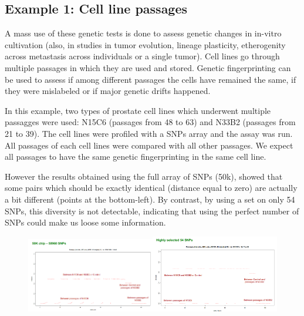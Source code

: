 \subsection*{Example 1: Cell line passages}

A mass use of these genetic tests is done to assess genetic changes in in-vitro cultivation (also, in studies in tumor evolution, lineage plasticity, etherogenity across metastasis across individuals or a single tumor).
Cell lines go through multiple passages in which they are used and stored. Genetic fingerprinting can be used to assess if among different passages the cells have remained the same, if they were mislabeled or if major genetic drifts happened.

In this example, two types of prostate cell lines which underwent multiple passagges were used: N15C6 (passages from 48 to 63) and N33B2 (passages from 21 to 39).
The cell lines were profiled with a SNPs array and the assay was run.
All passages of each cell lines were compared with all other passages. We expect all passages to have the same genetic fingerprinting in the same cell line.  

However the results obtained using the full array of SNPs (50k), showed that some pairs which should be exactly identical (distance equal to zero) are actually a bit different (points at the bottom-left).
By contrast, by using a set on only 54 SNPs, this diversity is not detectable, indicating  that using the perfect number of SNPs could make us loose some information. 

\begin{figure}
	\centering
	\includegraphics[width=0.5\textwidth]{cell_lines_1.PNG}\quad\includegraphics[width=0.5\textwidth]{cell_lines_2.PNG}
	\caption{\label{fig: cell_lines}}
\end{figure}

